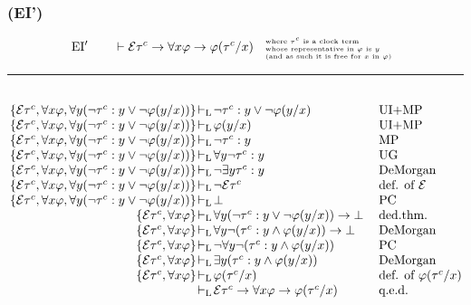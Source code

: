 \documentclass[xcolor=x11names]{beamer}
\newcommand{\lthen}{\rightarrow}
\newcommand{\derives}[1][]{\vdash_{\mathrm{#1}}}
\begin{document}
\begin{frame}[t]
\frametitle{(EI')}
\footnotesize

\[      \mathrm{EI'}  \qquad \vdash \mathcal E \tau^c \lthen \forall x \varphi \lthen \varphi (\tau^c /x)
        \textup{ \tiny \begin{tabular}{l}where $\tau^c$ is a clock term \\ whose representative in $\varphi$ is $y$ \\ (and as such it is free for $x$ in $\varphi$) \end{tabular}}      \]
\hrule
\bigskip

\[ \arraycolsep=.2mm
\begin{array}{rrclll}
\\ &\{\mathcal E \tau^c, \forall x\varphi, \forall y ( \lnot \tau^c : y \lor \lnot \varphi (y/x)) \}&\derives[L]&   \lnot \tau^c : y \lor \lnot \varphi (y/x)
     &&\textup{UI+MP}
\\ &\{\mathcal E \tau^c, \forall x\varphi, \forall y ( \lnot \tau^c : y \lor \lnot \varphi (y/x)) \}&\derives[L]&   \varphi (y/x)
     &&\textup{UI+MP}
\\ &\{\mathcal E \tau^c, \forall x\varphi, \forall y ( \lnot \tau^c : y \lor \lnot \varphi (y/x)) \}&\derives[L]&   \lnot \tau^c : y
     &&\textup{MP}
\\ &\{\mathcal E \tau^c, \forall x\varphi, \forall y ( \lnot \tau^c : y \lor \lnot \varphi (y/x)) \}&\derives[L]&   \forall y \lnot \tau^c : y
     &&\textup{UG}
\\ &\{\mathcal E \tau^c, \forall x\varphi, \forall y ( \lnot \tau^c : y \lor \lnot \varphi (y/x)) \}&\derives[L]&   \lnot \exists y \tau^c : y
     &&\textup{DeMorgan}
\\&\{\mathcal E \tau^c, \forall x\varphi, \forall y ( \lnot \tau^c : y \lor \lnot \varphi (y/x)) \}&\derives[L]&   \lnot \mathcal E\tau^c
     &&\textup{def. of $\mathcal E$}
\\ &\{\mathcal E \tau^c, \forall x\varphi, \forall y ( \lnot \tau^c : y \lor \lnot \varphi (y/x)) \}&\derives[L]&   \bot
     &&\textup{PC}
\\ &\{\mathcal E \tau^c, \forall x\varphi \}&\derives[L]&  \forall y ( \lnot \tau^c : y \lor \lnot \varphi (y/x))\lthen \bot
     &&\textup{ded.thm.}
\\ &\{\mathcal E \tau^c, \forall x\varphi \}&\derives[L]&  \forall y \lnot ( \tau^c : y \land \varphi (y/x))\lthen \bot
     &&\textup{DeMorgan}
\\ &\{\mathcal E \tau^c, \forall x\varphi \}&\derives[L]&  \lnot \forall y \lnot ( \tau^c : y \land \varphi (y/x))
     &&\textup{PC}
\\ &\{\mathcal E \tau^c, \forall x\varphi \}&\derives[L]&  \exists y ( \tau^c : y \land \varphi (y/x))
     &&\textup{DeMorgan}
\\ &\{\mathcal E \tau^c ,\forall x \varphi \}&\derives[L]&  \varphi (\tau^c /x)
     &&\textup{def. of $\varphi(\tau^c/x)$}
\\ &&\derives[L]&  \mathcal E \tau^c \lthen \forall x \varphi \lthen \varphi (\tau^c /x)
     &\quad&\textup{q.e.d.}
\end{array}
\]
\end{frame}
\end{document}
